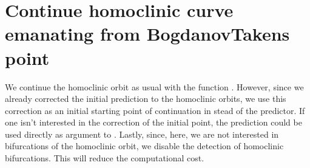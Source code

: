 \documentclass[letterpaper,10pt,english]{jupyterBook}
\begin{document}
\noindent{}


\section{Continue homoclinic curve emanating from Bogdanov\sphinxhyphen{}Takens point}
\label{\detokenize{CO-oxidation:id12}}
\sphinxAtStartPar
We continue the homoclinic orbit as usual with the  function .
However, since we already corrected the initial prediction to the homoclinic
orbits, we use this correction as an initial starting point of continuation in
stead of the predictor. If one isn’t interested in the correction of the
initial point, the prediction could be used directly as argument to .
Lastly, since, here, we are not interested in bifurcations of the homoclinic
orbit, we disable the detection of homoclinic bifurcations. This will
reduce the computational cost.

\begin{sphinxVerbatim}[commandchars=\\\{\}]
\PYG{p}{[}\PYG{p}{]}
\end{sphinxVerbatim}
\end{document}
